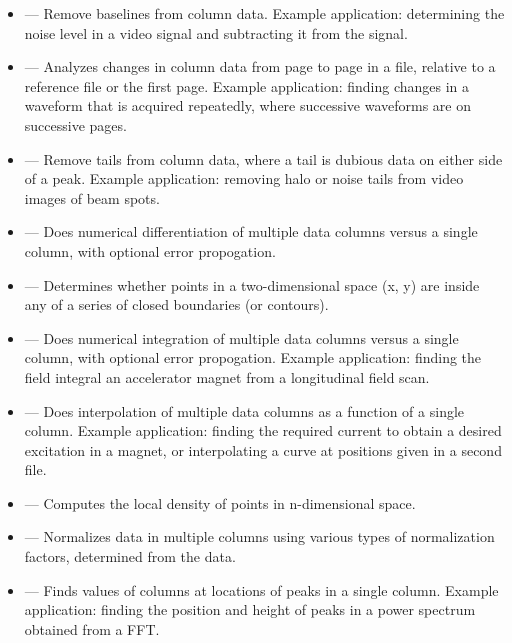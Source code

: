 \documentclass[11pt]{article}
\begin{document}
\begin{itemize}

\item {} --- Remove baselines from column data.  Example
application: determining the noise level in a video signal and subtracting
it from the signal.

\item {} --- Analyzes changes in column data from
page to page in a file, relative to a reference file or the first
page.  Example application: finding changes in a waveform that is
acquired repeatedly, where successive waveforms are on successive
pages.

\item {} --- Remove tails from column data, where a 
tail is dubious data on either side of a peak.  Example application: 
removing halo or noise tails from video images of beam spots.

\item {} --- Does numerical differentiation of multiple data columns
versus a single column, with optional error propogation.

\item {} --- Determines whether points in a two-dimensional space (x, y) are inside any of a
series of closed boundaries (or contours).

\item {} --- Does numerical integration of multiple data columns versus a single column, with
optional error propogation.  Example application: finding the field integral an accelerator magnet from a
longitudinal field scan.

\item {} --- Does interpolation of multiple data columns as a function of a single column.
Example application: finding the required current to obtain a desired excitation in a magnet, or interpolating a
curve at positions given in a second file.

\item {} --- Computes the local density of points in n-dimensional space.

\item {} --- Normalizes data in multiple columns using various types of
normalization factors, determined from the data.  

\item {} --- Finds values of columns at locations of peaks in a single column.  Example
application: finding the position and height of peaks in a power spectrum obtained from a FFT.


\end{itemize}
\end{document}
